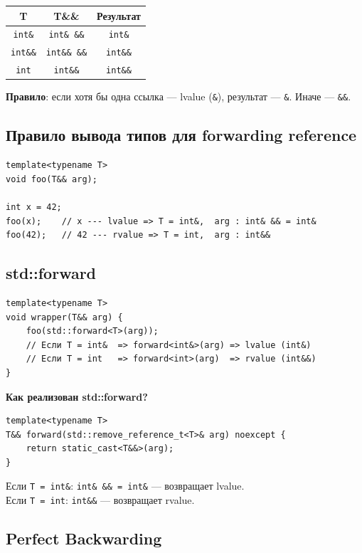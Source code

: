 \documentclass[12pt,a4paper]{article}
\begin{document}
\begin{center}
\begin{tabular}{|c|c|c|}
\hline
\textbf{T} & \textbf{T\&\&} & \textbf{Результат} \\
\hline
\texttt{int\&} & \texttt{int\& \&\&} & \texttt{int\&} \\
\texttt{int\&\&} & \texttt{int\&\& \&\&} & \texttt{int\&\&} \\
\texttt{int} & \texttt{int\&\&} & \texttt{int\&\&} \\
\hline
\end{tabular}
\end{center}

\textbf{Правило}: если хотя бы одна ссылка --- lvalue (\texttt{\&}), результат --- \texttt{\&}. Иначе --- \texttt{\&\&}.

\subsection{Правило вывода типов для forwarding reference}

\begin{lstlisting}
template<typename T>
void foo(T&& arg);

int x = 42;
foo(x);    // x --- lvalue => T = int&,  arg : int& && = int&
foo(42);   // 42 --- rvalue => T = int,  arg : int&&
\end{lstlisting}

\subsection{std::forward}

\begin{lstlisting}
template<typename T>
void wrapper(T&& arg) {
    foo(std::forward<T>(arg));
    // Если T = int&  => forward<int&>(arg) => lvalue (int&)
    // Если T = int   => forward<int>(arg)  => rvalue (int&&)
}
\end{lstlisting}

\textbf{Как реализован std::forward?}
\begin{lstlisting}
template<typename T>
T&& forward(std::remove_reference_t<T>& arg) noexcept {
    return static_cast<T&&>(arg);
}
\end{lstlisting}
Если \texttt{T = int\&}: \texttt{int\& \&\& = int\&} --- возвращает lvalue.\\
Если \texttt{T = int}: \texttt{int\&\&} --- возвращает rvalue.

\subsection{Perfect Backwarding}
\end{document}
